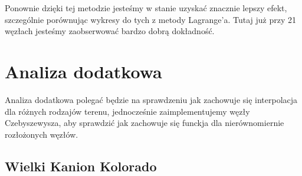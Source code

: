 \documentclass{article}
\begin{document}
Ponownie dzięki tej metodzie jesteśmy w stanie uzyskać znacznie lepszy efekt, szczególnie porównując wykresy do tych z metody Lagrange'a. Tutaj już przy 21 węzłach jesteśmy zaobserwować bardzo dobrą dokładność.

\clearpage
\section{Analiza dodatkowa}

Analiza dodatkowa polegać będzie na sprawdzeniu jak zachowuje się interpolacja dla różnych rodzajów terenu, jednocześnie zaimplementujemy węzły Czebyszewysza, aby sprawdzić jak zachowuje się funckja dla nierównomiernie rozłożonych węzłów. 

\subsection{Wielki Kanion Kolorado}
\end{document}
